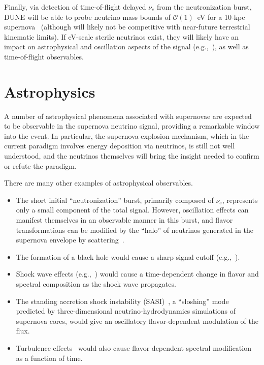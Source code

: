 Finally, via detection of time-of-flight delayed $\nu_e$ from the  neutronization burst,  DUNE will be able to probe neutrino mass bounds of $\mathcal{O}(1)$~eV for a 10-kpc supernova~\cite{Rossi-Torres:2015rla} (although will likely not be competitive with near-future terrestrial kinematic limits). If eV-scale sterile neutrinos exist, they will likely have an impact on astrophysical and oscillation aspects of the signal (e.g.,~\cite{Keranen:2007ga,Tamborra:2011is,Esmaili:2014gya}), as well as time-of-flight observables. 


\section{Astrophysics}
\label{sec:physics-snblowe-astrophysics}


A number of astrophysical phenomena associated with supernovae are expected to be observable
in the supernova neutrino signal, providing a remarkable window into the event.  In particular, the supernova explosion mechanism, which in the current paradigm involves energy deposition via neutrinos, is still not well understood, and the neutrinos themselves will bring the insight needed to confirm or refute the paradigm.

There are many other examples of astrophysical observables.
\begin{itemize}
\item The short initial ``neutronization'' burst, primarily composed of $\nu_e$, %
  represents only a small component of the total signal.  However,
  oscillation effects can manifest themselves in an observable manner
  in this burst, and flavor transformations can be modified by the
  ``halo'' of neutrinos generated in the supernova envelope by
  scattering~\cite{Cherry:2013mv}. 
  
\item The formation of a black hole would cause a sharp signal cutoff
  (e.g.,~\cite{Beacom:2000qy,Fischer:2008rh}).
\item Shock wave effects (e.g.,~\cite{Schirato:2002tg}) would cause a
  time-dependent change in flavor and spectral composition as the
  shock wave propagates.
\item The standing accretion shock instability
  (SASI)~\cite{Hanke:2011jf,Hanke:2013ena}, a ``sloshing'' mode
  predicted by three-dimensional neutrino-hydrodynamics simulations of
  supernova cores, would give an oscillatory flavor-dependent
  modulation of the flux.
\item Turbulence effects~\cite{Friedland:2006ta,Lund:2013uta} would
  also cause flavor-dependent spectral modification as a function of
  time.
\end{itemize}

